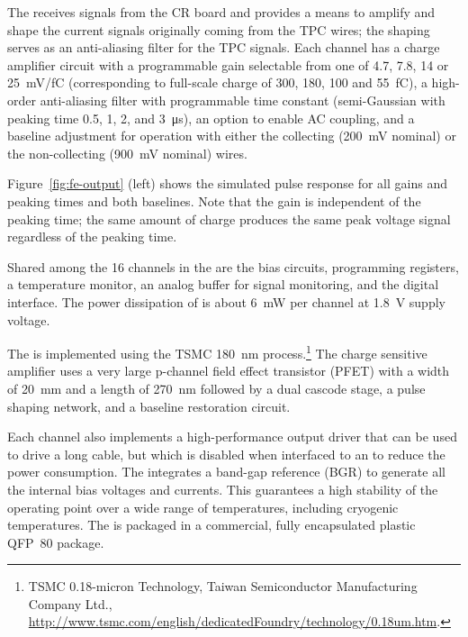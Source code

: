 The  receives signals from the CR board and
provides a means to amplify and shape the current signals originally coming from the TPC wires; the
shaping serves as an anti-aliasing filter for the TPC signals.
Each  channel has a charge amplifier circuit with a programmable
gain selectable from one of \num{4.7}, \num{7.8}, \num{14} or \SI{25}{mV/fC}
(corresponding to full-scale charge of \num{300}, \num{180}, \num{100} and \SI{55}{fC}),
a high-order anti-aliasing filter with programmable time
constant (semi-Gaussian with peaking time \num{0.5}, \num{1}, \num{2}, and \SI{3}{\micro\second}),
an option to enable AC coupling,
and a baseline adjustment for operation with either the collecting (\SI{200}{mV} nominal) or the non-collecting (\SI{900}{mV} nominal) wires.

Figure~\ref{fig:fe-output} (left) shows the simulated pulse response for all gains and peaking times and both baselines.
Note that the gain is independent of the peaking time;  the same amount of charge produces the same peak voltage signal regardless of the peaking time.  

Shared among the \num{16} channels in the  are the bias circuits, programming registers,
a temperature monitor, an analog buffer for signal monitoring, and the digital interface.
The power dissipation of  is about \SI{6}{mW} per channel at \SI{1.8}{V} supply voltage.

The  is implemented using the TSMC \SI{180}{nm}  process.\footnote{TSMC 0.18-micron Technology\texttrademark{}, Taiwan Semiconductor Manufacturing Company Ltd., \url{http://www.tsmc.com/english/dedicatedFoundry/technology/0.18um.htm}.}  The charge sensitive amplifier uses a very large p-channel field effect transistor (PFET) with a width of \SI{20}{mm} and a length of \SI{270}{nm} followed by a dual cascode stage, a pulse shaping network, and a baseline restoration circuit.  

Each channel also implements a high-performance output driver 
that can be used to drive a long cable, but which is disabled when interfaced to an   to reduce the power consumption.
The  integrates a band-gap reference (BGR) to generate all the internal bias voltages and currents.
This guarantees a high stability of the operating point over a wide range of
temperatures, including cryogenic temperatures.
The  is packaged in a commercial, fully encapsulated plastic QFP~80 package.

